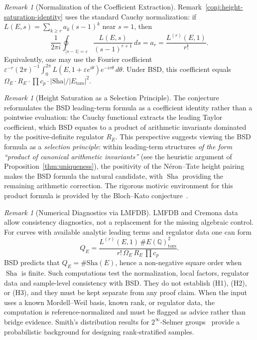 \documentclass[aps,prd,twocolumn,superscriptaddress,nofootinbib,floatfix]{revtex4-2}
\theoremstyle{definition}
\theoremstyle{remark}
\newtheorem{remark}[theorem]{Remark}
\DeclareMathOperator{\Sha}{Sha}
\begin{document}
\begin{remark}[Normalization of the Coefficient Extraction]\label{rem:disc-normalization}
Remark~\ref{conj:height-saturation-identity} uses the standard Cauchy normalization: if $L(E,s)=\sum_{k\geq r} a_k(s-1)^k$ near $s=1$, then
\[
\frac{1}{2\pi i}\oint_{|s-1|=\varepsilon}
  \frac{L(E,s)}{(s-1)^{r+1}}\,ds
 = a_r = \frac{L^{(r)}(E,1)}{r!}.
\]
Equivalently, one may use the Fourier coefficient
$\varepsilon^{-r}(2\pi)^{-1}\int_0^{2\pi} L(E,1+\varepsilon e^{i\theta})e^{-ir\theta}\,d\theta$.
Under BSD, this coefficient equals $\Omega_E \cdot R_E \cdot \prod c_p \cdot |\mathrm{Sha}| / |E_{\mathrm{tors}}|^2$.
\end{remark}

\begin{remark}[Height Saturation as a Selection Principle]
\label{rem:height-saturation}
The conjecture reformulates the BSD leading-term formula as a coefficient identity rather than a pointwise evaluation: the Cauchy functional extracts the leading Taylor coefficient, which BSD equates to a product of arithmetic invariants dominated by the positive-definite regulator $R_E$. This perspective suggests viewing the BSD formula as a \emph{selection principle}: within leading-term structures \textit{of the form ``product of canonical arithmetic invariants''} (see the heuristic argument of Proposition~\ref{thm:uniqueness}), the positivity of the Néron--Tate height pairing makes the BSD formula the natural candidate, with $\Sha$ providing the remaining arithmetic correction. The rigorous motivic environment for this product formula is provided by the Bloch--Kato conjecture~\cite{BlochKato1990}.
\end{remark}

\begin{remark}[Numerical Diagnostics via LMFDB]\label{rem:lmfdb-saturation}
LMFDB and Cremona data allow consistency diagnostics, not a replacement for the missing algebraic control. For curves with available analytic leading terms and regulator data one can form
\[
Q_E =
\frac{L^{(r)}(E,1)\,\#E(\mathbb{Q})_{\mathrm{tors}}^2}
     {r!\,\Omega_E\,R_E\,\prod c_p}.
\]
BSD predicts that $Q_E=\#\mathrm{Sha}(E)$, hence a non-negative square order when $\Sha$ is finite. Such computations test the normalization, local factors, regulator data and sample-level consistency with BSD. They do not establish (H1), (H2), or (H3), and they must be kept separate from any proof claim. When the input uses a known Mordell--Weil basis, known rank, or regulator data, the computation is reference-normalized and must be flagged as advice rather than bridge evidence. Smith's distribution results for $2^\infty$-Selmer groups~\cite{Smith2022} provide a probabilistic background for designing rank-stratified samples.
\end{remark}
\end{document}
